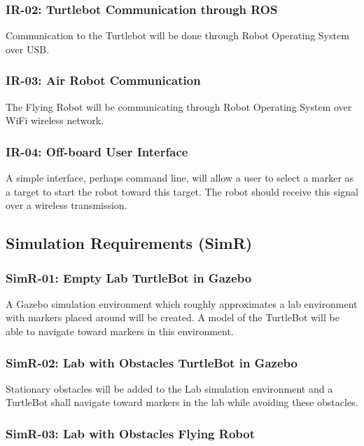 \documentclass{article}
\begin{document}
		\subsubsection{IR-02: Turtlebot Communication through ROS}
		
		Communication to the Turtlebot will be done through Robot Operating System over USB.
		
		\subsubsection{IR-03: Air Robot Communication}
		
		The Flying Robot will be communicating through Robot Operating System over WiFi wireless network. 
		
		\subsubsection{IR-04: Off-board User Interface}
		
		A simple interface, perhaps command line, will allow a user to select a marker as a target to start the robot toward this target. The robot should receive this signal over a wireless transmission.
		
	\subsection{Simulation Requirements (SimR)}
	
		\subsubsection{SimR-01: Empty Lab TurtleBot in Gazebo}
		
		A Gazebo simulation environment which roughly approximates a lab environment with markers placed around will be created. A model of the TurtleBot will be able to navigate toward markers in this environment.
		
		\subsubsection{SimR-02: Lab with Obstacles TurtleBot in Gazebo}
		
		Stationary obstacles will be added to the Lab simulation environment and a TurtleBot shall navigate toward markers in the lab while avoiding these obstacles.
		
		\subsubsection{SimR-03: Lab with Obstacles Flying Robot}
		
\end{document}
